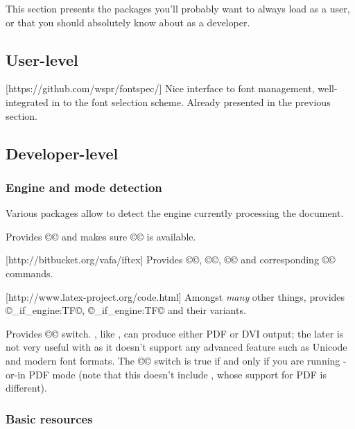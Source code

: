 \documentclass{lltxdoc}
\begin{document}
This section presents the packages you'll probably want to always load as a
user, or that you should absolutely know about as a developer.

\subsection{User-level}

[https://github.com/wspr/fontspec/]
Nice interface to font management, well-integrated in to the \latex font
selection scheme. Already presented in the previous section.

\subsection{Developer-level}

\subsubsection{Engine and mode detection}\label{detect}

Various packages allow to detect the engine currently processing the document.

Provides ©\ifluatex© and makes sure ©\luatexversion© is available.

[http://bitbucket.org/vafa/iftex]
Provides ©\ifPDFTeX©, ©\ifXeTeX©, ©\ifLuaTeX© and corresponding ©\Require©
commands.

[http://www.latex-project.org/code.html]
Amongst \emph{many} other things, provides ©\luatex_if_engine:TF©,
©\xetex_if_engine:TF© and their variants.

Provides ©\ifpdf© switch. \luatex, like \pdftex, can produce either PDF or DVI
output; the later is not very useful with \luatex as it doesn't support any
advanced feature such as Unicode and modern font formats. The ©\ifpdf© switch
is true if and only if you are running \pdftex-or-\luatex in PDF mode (note
that this doesn't include \xetex, whose support for PDF is different).

\subsubsection{Basic resources}
\end{document}
